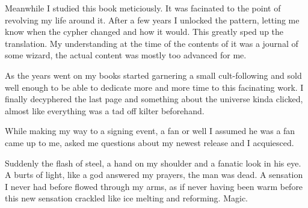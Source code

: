 \documentclass{article}
\begin{document}
Meanwhile I studied this book meticiously. It was facinated to the point of revolving my life around it. After a few years I unlocked the pattern, letting me know when the cypher changed and how it would. This greatly sped up the translation. My understanding at the time of the contents of it was a journal of some wizard, the actual content was mostly too advanced for me.

As the years went on my books started garnering a small cult-following and sold well enough to be able to dedicate more and more time to this facinating work. I finally decyphered the last page and something about the universe kinda clicked, almost like everything was a tad off kilter beforehand. 

While making my way to a signing event, a fan or well I assumed he was a fan came up to me, asked me questions about my newest release and I acquiesced. 

Suddenly the flash of steel, a hand on my shoulder and a fanatic look in his eye. A burts of light, like a god answered my prayers, the man was dead. A sensation I never had before flowed through my arms, as if never having been warm before this new sensation crackled like ice melting and reforming. Magic.
\end{document}
